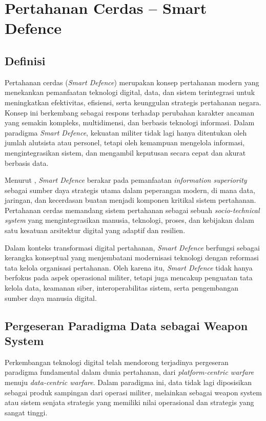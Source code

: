 \section{Pertahanan Cerdas – Smart Defence}
\subsection{Definisi}
Pertahanan cerdas (\textit{Smart Defence}) merupakan konsep pertahanan modern yang menekankan pemanfaatan teknologi digital, data, dan sistem terintegrasi untuk meningkatkan efektivitas, efisiensi, serta keunggulan strategis pertahanan negara.
Konsep ini berkembang sebagai respons terhadap perubahan karakter ancaman yang semakin kompleks, multidimensi, dan berbasis teknologi informasi.
Dalam paradigma \textit{Smart Defence}, kekuatan militer tidak lagi hanya ditentukan oleh jumlah alutsista atau personel, tetapi oleh kemampuan mengelola informasi, mengintegrasikan sistem, dan mengambil keputusan secara cepat dan akurat berbasis data.

Menurut \textcite{Koch2015}, \textit{Smart Defence} berakar pada pemanfaatan \textit{information superiority} sebagai sumber daya strategis utama dalam peperangan modern, di mana data, jaringan, dan kecerdasan buatan menjadi komponen kritikal sistem pertahanan.
Pertahanan cerdas memandang sistem pertahanan sebagai sebuah \textit{socio-technical system} yang mengintegrasikan manusia, teknologi, proses, dan kebijakan dalam satu kesatuan arsitektur digital yang adaptif dan resilien.

Dalam konteks transformasi digital pertahanan, \textit{Smart Defence} berfungsi sebagai kerangka konseptual yang menjembatani modernisasi teknologi dengan reformasi tata kelola organisasi pertahanan.
Oleh karena itu, \textit{Smart Defence} tidak hanya berfokus pada aspek operasional militer, tetapi juga mencakup penguatan tata kelola data, keamanan siber, interoperabilitas sistem, serta pengembangan sumber daya manusia digital.

\subsection{Pergeseran Paradigma Data sebagai Weapon System}
Perkembangan teknologi digital telah mendorong terjadinya pergeseran paradigma fundamental dalam dunia pertahanan, dari \textit{platform-centric warfare} menuju \textit{data-centric warfare}.
Dalam paradigma ini, data tidak lagi diposisikan sebagai produk sampingan dari operasi militer, melainkan sebagai weapon system atau sistem senjata strategis yang memiliki nilai operasional dan strategis yang sangat tinggi.

